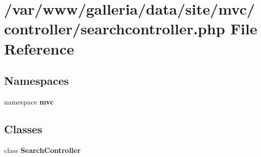 \section{/var/www/galleria/data/site/mvc/controller/searchcontroller.php File Reference}
\label{searchcontroller_8php}
\subsection*{Namespaces}
\begin{CompactItemize}
\item 
namespace {\bf mvc}
\end{CompactItemize}
\subsection*{Classes}
\begin{CompactItemize}
\item 
class {\bf SearchController}
\end{CompactItemize}
